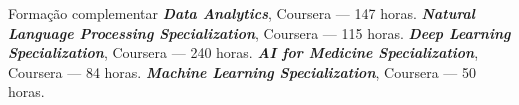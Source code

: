 \begin{rubric}{Formação complementar}
\entry*[2026] \textbf{\textit{Data Analytics}}, Coursera --- 147 horas.
\cvdivider
\entry*[2026] \textbf{\textit{Natural Language Processing Specialization}}, Coursera --- 115 horas.
\cvdivider
\entry*[2021] \textbf{\textit{Deep Learning Specialization}}, Coursera --- 240 horas.
\cvdivider
\entry*[2021] \textbf{\textit{AI for Medicine Specialization}}, Coursera --- 84 horas.
\cvdivider
\entry*[2021] \textbf{\textit{Machine Learning Specialization}}, Coursera --- 50 horas.
\end{rubric}
